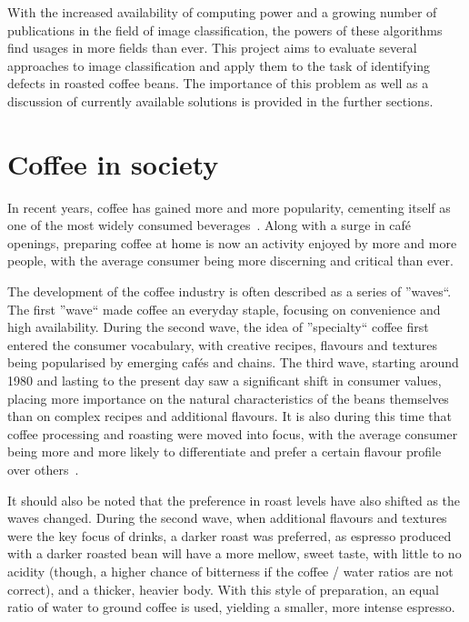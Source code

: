 With the increased availability of computing power and a growing number of publications in the field of
image classification, the powers of these algorithms find usages in more fields than ever.
This project aims to evaluate several approaches to image classification and apply them to the task of
identifying defects in roasted coffee beans.
The importance of this problem as well as a discussion of currently available solutions is provided in the further sections.
\section{Coffee in society}
\label{sec:coffee-in-society} In recent years, coffee has gained more and more popularity,
cementing itself as one of the most widely consumed beverages~\cite{coffeeConsumptionStats}.
Along with a surge
in café openings, preparing coffee at home is now an activity enjoyed by more
and more people, with the average consumer being more discerning and critical than
ever.

The development of the coffee industry is often described as a series of ''waves``.
The first ''wave`` made coffee an everyday staple, focusing on convenience and high
availability.
During the second wave, the idea of ''specialty`` coffee first entered
the consumer vocabulary, with creative recipes, flavours and textures being popularised
by emerging cafés and chains.
The third wave, starting around 1980 and lasting to
the present day saw a significant shift in consumer values, placing more importance on the natural characteristics
of the beans themselves than on complex recipes and additional flavours.
It is also during this time that coffee
processing and roasting were moved into focus, with the average consumer being more
and more likely to differentiate and prefer a certain flavour profile over others~\cite{coffeeWaves}.

It should also be noted that the preference in roast levels have also shifted as
the waves changed.
During the second wave, when additional flavours and textures
were the key focus of drinks, a darker roast was preferred, as espresso produced
with a darker roasted bean will have a more mellow, sweet taste, with little to no
acidity (though, a higher chance of bitterness if the coffee / water ratios are not
correct), and a thicker, heavier body.
With this style of preparation, an equal
ratio of water to ground coffee is used, yielding a smaller, more intense
espresso.

